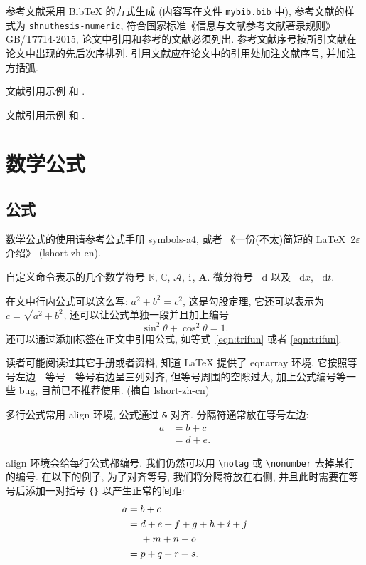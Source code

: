 \documentclass[a4paper,12pt]{article}
\theoremstyle{plain}
\newcommand{\dif}{\mathop{}\!\mathrm{d}}
\newcommand{\CC}{\ensuremath{\mathbb{C}}}
\newcommand{\RR}{\ensuremath{\mathbb{R}}}
\newcommand{\dx}[1][x]{\mathop{}\!\mathrm{d}#1}
\newcommand{\ii}{\mathrm{i}\mkern1mu} %
\newcommand{\A}{\mathcal{A}}
\newcommand{\bA}{\boldsymbol{A}}
\begin{document}
参考文献采用 BibTeX 的方式生成 (内容写在文件 \verb|mybib.bib| 中), 参考文献的样式为 \verb|shnuthesis-numeric|, 符合国家标准《信息与文献参考文献著录规则》GB/T7714-2015, 论文中引用和参考的文献必须列出. 参考文献序号按所引文献在论文中出现的先后次序排列. 引用文献应在论文中的引用处加注文献序号, 并加注方括弧.

文献引用示例 \cite{Tadmor2012} 和 \cite{LiLiu1997,Adams2003,TreWei2014}.

文献引用示例 \cite{LiLiu1997} 和 \cite{Adams2003,Shen1994}.


\section{数学公式}

\subsection{公式}
数学公式的使用请参考公式手册 symbols-a4, 或者 《一份(不太)简短的 \LaTeX~2$\varepsilon$ 介绍》 (lshort-zh-cn).

自定义命令表示的几个数学符号 $\RR$, $\CC$, $\A$, $\ii$, $\bA$. 微分符号 $\dif$ 以及 $\dx$, $\dx[t]$.

在文中行内公式可以这么写: $a^2+b^2=c^2$, 这是勾股定理, 它还可以表示为 $c=\sqrt{a^2+b^2}$, 还可以让公式单独一段并且加上编号
\begin{equation}\label{eqn:trifun}
\sin^2{\theta}+\cos^2{\theta}=1.
\end{equation}
还可以通过添加标签在正文中引用公式, 如等式~\eqref{eqn:trifun} 或者 \ref{eqn:trifun}.

读者可能阅读过其它手册或者资料, 知道 LaTeX 提供了 eqnarray 环境. 它按照等号左边—等号—等号右边呈三列对齐, 但等号周围的空隙过大, 加上公式编号等一些 bug, 目前已不推荐使用. (摘自 lshort-zh-cn)

多行公式常用 align 环境, 公式通过 \verb|&| 对齐. 分隔符通常放在等号左边:
\begin{align}
a & = b + c \\
& = d + e.
\end{align}

align 环境会给每行公式都编号. 我们仍然可以用 \verb|\notag| 或 \verb|\nonumber| 去掉某行的编号. 在以下的例子,
为了对齐等号, 我们将分隔符放在右侧, 并且此时需要在等号后添加一对括号 \verb|{}| 以产生正常的间距:
\begin{align}
a ={} & b + c \\
={} & d + e + f + g + h + i + j \notag \\
& + m + n + o \\
={} & p + q + r + s.
\end{align}
\end{document}
